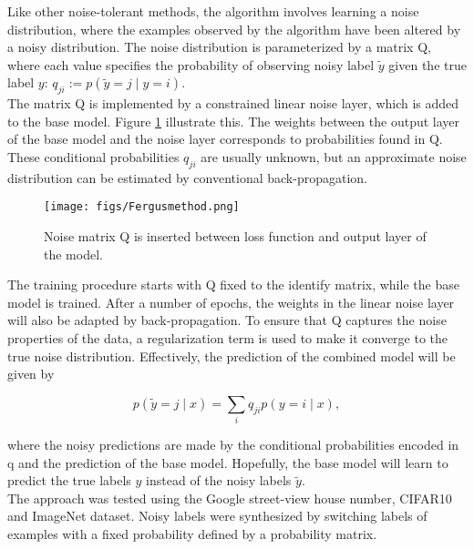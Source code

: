 Like other noise-tolerant methods, the algorithm involves learning a noise distribution, where the examples observed by the algorithm have been altered by a noisy distribution. The noise distribution is parameterized by a matrix Q, where each value specifies the probability of observing noisy label $\tilde{y}$ given the true label $y$: $q_{ji} := p(\tilde{y} = j \mid y = i)$. \\

The matrix Q is implemented by a constrained linear noise layer, which is added to the base model. Figure \ref{fig:fergus_method} illustrate this. The weights between the output layer of the base model and the noise layer corresponds to probabilities found in Q. These conditional probabilities $q_{ji}$ are usually unknown, but an approximate noise distribution can be estimated by conventional back-propagation. \\

\begin{figure}
\begin{center}
\texttt{[image: figs/Fergusmethod.png]}
\caption[Noise matrix Q]{Noise matrix Q is inserted between loss function and output layer of the model. }
\label{fig:fergus_method}
\end{center}
\end{figure}

The training procedure starts with Q fixed to the identify matrix, while the base model is trained. After a number of epochs, the weights in the linear noise layer will also be adapted by back-propagation. To ensure that Q captures the noise properties of the data, a regularization term is used to make it converge to the true noise distribution. Effectively, the prediction of the combined model will be given by

$$p(\tilde{y} = j \mid x) = \sum_{i} q_{ji}p(y = i \mid x),$$ 

where the noisy predictions are made by the conditional probabilities encoded in q and the prediction of the base model. Hopefully, the base model will learn to predict the true labels $y$ instead of the noisy labels $\tilde{y}$.  \\

The approach was tested using the Google street-view house number, CIFAR10 and ImageNet dataset. Noisy labels were synthesized by switching labels of examples with a fixed probability defined by a probability matrix. \\

